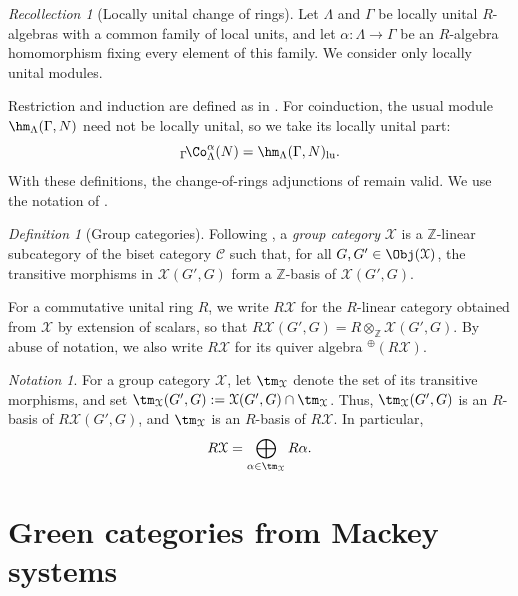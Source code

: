 \documentclass{amsart}
\numberwithin{equation}{section}%
\theoremstyle{remark}
\newtheorem{Def}[equation]{Definition}
\newtheorem{Not}[equation]{Notation}
\newtheorem{Rec}[equation]{Recollection}
\theoremstyle{definition}
\newcommand{\lCo}[1]{{}_{#1}\!\Co}
\begin{document}
%
\begin{Rec}[Locally unital change of rings]
\label{rec:change-of-rings-locally-unital}
Let $\Lambda$ and $\Gamma$ be locally unital $R$-algebras with a
common family of local units, and let
$\alpha\colon\Lambda\to\Gamma$
be an $R$-algebra homomorphism fixing every element of this family.
We consider only locally unital modules.

Restriction and induction are defined as in
. For coinduction, the usual module
$\hm_{\Lambda}(\Gamma,N)$ need not be locally unital, so we take its
locally unital part:
%
\[
\lCo{\Gamma}_{\Lambda}^{\alpha}(N)
=
\hm_{\Lambda}(\Gamma,N)_{\mathrm{lu}}.
\]
%
With these definitions, the change-of-rings adjunctions of
 remain valid.
We use the notation of .
\end{Rec}
%
\begin{Def}[Group categories]
\label{def:group-category}
Following \cite[Sec. 2]{Barker16b}, a \emph{group category}
$\mathcal X$ is a $\mathbb Z$-linear subcategory of the biset
category $\mathcal C$ such that, for all
$G,G'\in\Obj(\mathcal X)$, the transitive morphisms in
$\mathcal X(G',G)$ form a $\mathbb Z$-basis of
$\mathcal X(G',G)$.
\end{Def}
%
For a commutative unital ring $R$, we write $R\mathcal X$ for the
$R$-linear category obtained from $\mathcal X$ by extension of scalars,
so that
$R\mathcal X(G',G)
=
R\otimes_{\mathbb Z}\mathcal X(G',G)$.
By abuse of notation, we also write $R\mathcal X$ for its quiver
algebra ${}^{\oplus}(R\mathcal X)$.
%
\begin{Not}
\label{not:transitive-morphisms}
For a group category $\mathcal X$, let $\tm_{\mathcal X}$ denote
the set of its transitive morphisms, and set
$\tm_{\mathcal X}(G',G)
:=
\mathcal X(G',G)\cap\tm_{\mathcal X}$.
Thus, $\tm_{\mathcal X}(G',G)$ is an $R$-basis of
$R\mathcal X(G',G)$, and $\tm_{\mathcal X}$ is an $R$-basis of
$R\mathcal X$. In particular,
%
\[
R\mathcal X
=
\bigoplus_{\alpha\in\tm_{\mathcal X}}R\alpha.
\]
%
\end{Not}
%


%
\section{Green categories from Mackey systems}
\label{sec:green-categories-from-mackey-systems}
%
\end{document}
